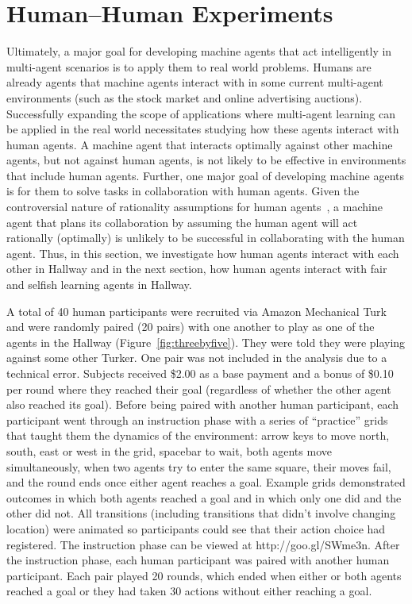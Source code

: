 \documentclass[letterpaper]{article}
\begin{document}
\section{Human--Human Experiments}

Ultimately, a major goal for developing machine agents that act
intelligently in multi-agent scenarios is to apply them to real world
problems. Humans are already agents that machine agents interact with
in some current multi-agent environments (such as the stock
market and online advertising auctions). Successfully expanding the scope of applications where
multi-agent learning can be applied in the real world necessitates
studying how these agents interact with human agents. A machine agent
that interacts optimally against other machine agents, but not against
human agents, is not likely to be effective in environments that
include human agents. Further, one major goal of developing machine
agents is for them to solve tasks in collaboration with human
agents. Given the controversial nature of rationality assumptions for
human agents~\cite{kahnemanst82}, a machine agent that plans its
collaboration by assuming the human agent will act rationally
(optimally) is unlikely to be successful in collaborating with the
human agent. Thus, in this section, we investigate how human agents
interact with each other in Hallway and in the next section, how human
agents interact with fair and selfish learning agents in Hallway.

A total of 40 human participants were recruited via Amazon Mechanical
Turk and were randomly paired (20 pairs) with one another to play as
one of the agents in the Hallway (Figure~\ref{fig:threebyfive}). They
were told they were playing against some other Turker. One pair was
not included in the analysis due to a technical error. Subjects
received \$2.00 as a base payment and a bonus of \$0.10 per round
where they reached their goal (regardless of whether the other agent
also reached its goal). Before being paired with another human
participant, each participant went through an instruction phase with a
series of ``practice'' grids that taught them the dynamics of the
environment: arrow keys to move north, south, east or west in the
grid, spacebar to wait, both agents move simultaneously, when two
agents try to enter the same square, their moves fail, and the round
ends once either agent reaches a goal.  Example grids demonstrated
outcomes in which both agents reached a goal and in which only one did
and the other did not. All transitions (including transitions that
didn't involve changing location) were animated so participants could
see that their action choice had registered.
The instruction phase can be viewed at http://goo.gl/SWme3n. After
the instruction phase, each human participant was paired with another
human participant. Each pair played 20 rounds, which ended when either
or both agents reached a goal or they had taken 30 actions
without either reaching a goal.
\end{document}
